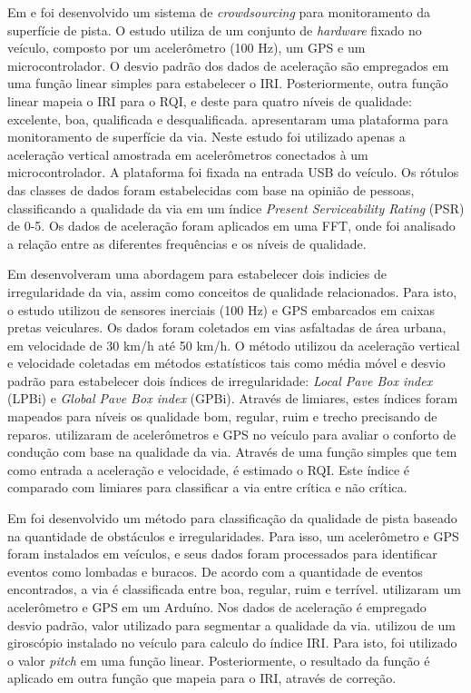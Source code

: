 Em \cite{Chen2013} e \cite{Chen2016} foi desenvolvido um sistema de \textit{crowdsourcing} para monitoramento da superfície de pista. O estudo utiliza de um conjunto de \textit{hardware} fixado no veículo, composto por um acelerômetro (100 Hz), um GPS e um microcontrolador. O desvio padrão dos dados de aceleração são empregados em uma função linear simples para estabelecer o IRI. Posteriormente, outra função linear mapeia o IRI para o RQI, e deste para quatro níveis de qualidade: excelente, boa, qualificada e desqualificada. \cite{Lei2018} apresentaram uma plataforma para monitoramento de superfície da via. Neste estudo foi utilizado apenas a aceleração vertical amostrada em acelerômetros conectados à um microcontrolador. A plataforma foi fixada na entrada USB do veículo. Os rótulos das classes de dados foram estabelecidas com base na opinião de pessoas, classificando a qualidade da via em um índice \textit{Present Serviceability Rating} (PSR) de 0-5. Os dados de aceleração foram aplicados em uma FFT, onde foi analisado a relação entre as diferentes frequências e os níveis de qualidade.

Em \cite{Monica2021} desenvolveram uma abordagem para estabelecer dois indicies de irregularidade da via, assim como conceitos de qualidade relacionados. Para isto, o estudo utilizou de sensores inerciais (100 Hz) e GPS embarcados em caixas pretas veiculares. Os dados foram coletados em vias asfaltadas de área urbana, em velocidade de 30 km/h até 50 km/h. O método utilizou da aceleração vertical e velocidade coletadas em métodos estatísticos tais como média móvel e desvio padrão para estabelecer dois índices de irregularidade: \textit{Local Pave Box index} (LPBi) e \textit{Global Pave Box index}  (GPBi). Através de limiares, estes índices foram mapeados para níveis os qualidade bom, regular, ruim e trecho precisando de reparos. \cite{Pont2017} utilizaram de acelerômetros e GPS no veículo para avaliar o conforto de condução com base na qualidade da via. Através de uma função simples que tem como entrada a aceleração e velocidade, é estimado o RQI. Este índice é comparado com limiares para classificar a via entre crítica e não crítica.

Em \cite{Hassan2019} foi desenvolvido um método para classificação da qualidade de pista baseado na quantidade de obstáculos e irregularidades. Para isso, um acelerômetro e GPS foram instalados em veículos, e seus dados foram processados para identificar eventos como lombadas e buracos. De acordo com a quantidade de eventos encontrados, a via é classificada entre boa, regular, ruim e terrível. \cite{Prapulla2017} utilizaram um acelerômetro e GPS em um Arduíno. Nos dados de aceleração é empregado desvio padrão, valor utilizado para segmentar a qualidade da via. \cite{Pitonak2016} utilizou de um giroscópio instalado no veículo para calculo do índice IRI. Para isto, foi utilizado o valor \textit{pitch} em uma função linear. Posteriormente, o resultado da função é aplicado em outra função que mapeia para o IRI, através de correção.

